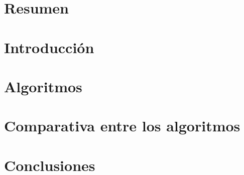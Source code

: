 \documentclass[a4paper,10pt,twoside]{report}
\author{\me}
\begin{document}


\normalsize

\chapter*{Resumen}\label{chapter:Resumen}
\setcounter{page}{0}


\tableofcontents

\chapter{Introducción}\label{chapter:Introduccion}


\chapter{Algoritmos}\label{chapter:Algoritmos}


\chapter{Comparativa entre los algoritmos}\label{chapter:Comparativa}


\chapter{Conclusiones}\label{chapter:Conclusiones}


\renewcommand{\bibname}{Bibliografia}


\end{document}
